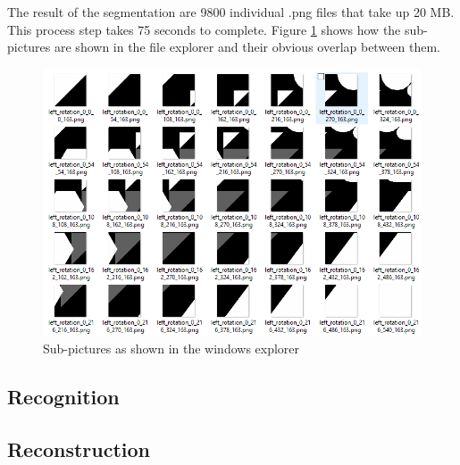 \documentclass[conference]{IEEEtran}
\begin{document}
The result of the segmentation are 9800 individual .png files that take up 20 MB. This process step takes 75 seconds to complete. Figure \ref{fig:segmented} shows how the sub-pictures are shown in the file explorer and their obvious overlap between them.
\begin{figure}[H]
	\begin{center}
		\includegraphics[width=0.9\linewidth]{pictures/segments.png}
		\caption{Sub-pictures as shown in the windows explorer}
		\label{fig:segmented}
	\end{center}
\end{figure}
  
\subsection{Recognition}
\subsection{Reconstruction}
\end{document}
